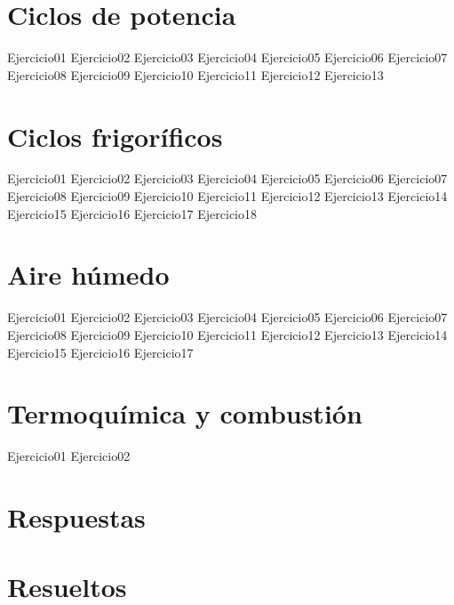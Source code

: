 \documentclass[10pt,a4paper,oneside]{book}
\begin{document}
\chapter{Ciclos de potencia}
{Ejercicio01}
{Ejercicio02}
{Ejercicio03}
{Ejercicio04}
{Ejercicio05}
{Ejercicio06}
{Ejercicio07}
{Ejercicio08}
{Ejercicio09}
{Ejercicio10}
{Ejercicio11}
{Ejercicio12}
{Ejercicio13}
\chapter{Ciclos frigoríficos}
{Ejercicio01}
{Ejercicio02}
{Ejercicio03}
{Ejercicio04}
{Ejercicio05}
{Ejercicio06}
{Ejercicio07}
{Ejercicio08}
{Ejercicio09}
{Ejercicio10}
{Ejercicio11}
{Ejercicio12}
{Ejercicio13}
{Ejercicio14}
{Ejercicio15}
{Ejercicio16}
{Ejercicio17}
{Ejercicio18}
\chapter{Aire húmedo}
{Ejercicio01}
{Ejercicio02}
{Ejercicio03}
{Ejercicio04}
{Ejercicio05}
{Ejercicio06}
{Ejercicio07}
{Ejercicio08}
{Ejercicio09}
{Ejercicio10}
{Ejercicio11}
{Ejercicio12}
{Ejercicio13}
{Ejercicio14}
{Ejercicio15}
{Ejercicio16}
{Ejercicio17}
\chapter{Termoquímica y combustión}
{Ejercicio01}
{Ejercicio02}
\chapter{Respuestas}
\chapter{Resueltos}
\end{document}
